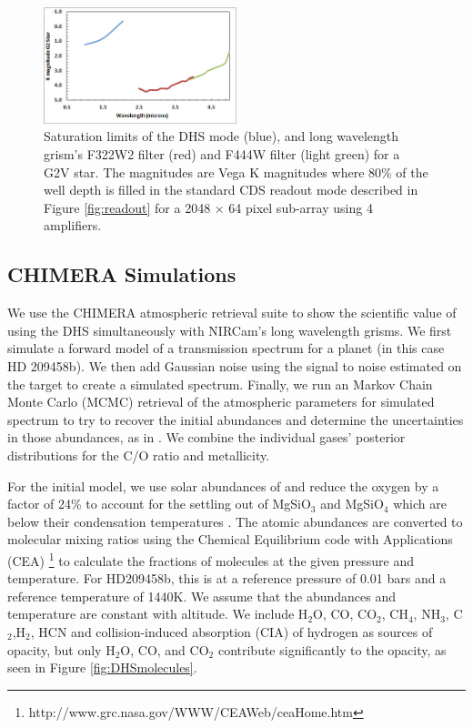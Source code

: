 \documentclass{emulateapj}
\begin{document}
\begin{figure}[!ht]
\includegraphics[width=0.5\textwidth]{sat_limits.jpg}
\caption{Saturation limits of the DHS mode (blue), and long wavelength grism's F322W2 filter (red) and F444W filter (light green) for a G2V star. The magnitudes are Vega K magnitudes where 80\% of the well depth is filled in the standard CDS readout mode described in Figure \ref{fig:readout}  for a 2048 $\times$ 64 pixel sub-array using 4 amplifiers.}\label{fig:DHSaps}
\end{figure}

\subsection{CHIMERA Simulations}\label{sec:simulations}

We use the CHIMERA atmospheric retrieval suite \citep{line2013chimera,line2014CtOsecE} to show the scientific value of using the DHS simultaneously with NIRCam's long wavelength grisms. We first simulate a forward model of a transmission spectrum for a planet (in this case HD 209458b). We then add Gaussian noise using the signal to noise estimated on the target to create a simulated spectrum. Finally, we run an Markov Chain Monte Carlo (MCMC) retrieval of the atmospheric parameters for simulated spectrum to try to recover the initial abundances and determine the uncertainties in those abundances, as in \citet{greene2016jwst_trans}. We combine the individual gases' posterior distributions for the C/O ratio and metallicity.

For the initial model, we use solar abundances of \citet{asplund} and reduce the oxygen by a factor of 24\% to account for the settling out of MgSiO$_3$ and MgSiO$_4$ which are below their condensation temperatures \citep{sing2016continuum}. The atomic abundances are converted to molecular mixing ratios using the Chemical Equilibrium code with Applications (CEA) \footnote{http://www.grc.nasa.gov/WWW/CEAWeb/ceaHome.htm}\citep{gordon1996cea} to calculate the fractions of molecules at the given pressure and temperature. For HD209458b, this is at a reference pressure of 0.01 bars and a reference temperature of 1440K. We assume that the abundances and temperature are constant with altitude. We include H$_2$O, CO, CO$_2$, CH$_4$, NH$_3$, C$_2$,H$_2$, HCN and collision-induced absorption (CIA) of hydrogen as sources of opacity, but only H$_2$O, CO, and CO$_2$ contribute significantly to the opacity, as seen in Figure \ref{fig:DHSmolecules}.
\end{document}
